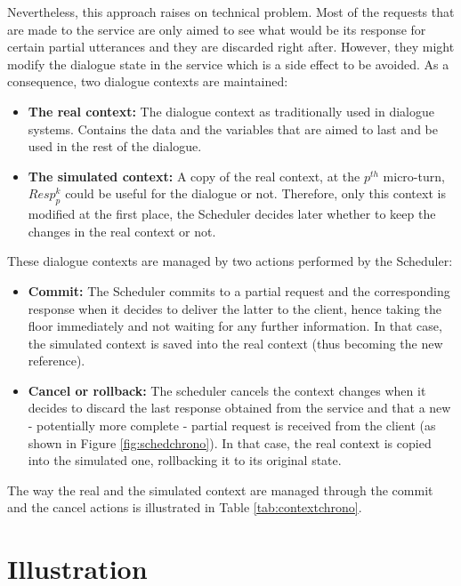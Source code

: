         Nevertheless, this approach raises on technical problem. Most of the requests that are made to the service are only aimed to see what would be its response for certain partial utterances and they are discarded right after. However, they might modify the dialogue state in the service which is a side effect to be avoided. As a consequence, two dialogue contexts are maintained:
        
        \begin{itemize}
           	\item \textbf{The real context:} The dialogue context as traditionally used in dialogue systems. Contains the data and the variables that are aimed to last and be used in the rest of the dialogue.
        	\item \textbf{The simulated context:} A copy of the real context, at the $p^{th}$ micro-turn, $Resp^k_p$ could be useful for the dialogue or not. Therefore, only this context is modified at the first place, the Scheduler decides later whether to keep the changes in the real context or not.
        \end{itemize}
        
        These dialogue contexts are managed by two actions performed by the Scheduler:
        
        \begin{itemize}
        	\item \textbf{Commit:} The Scheduler commits to a partial request and the corresponding response when it decides to deliver the latter to the client, hence taking the floor immediately and not waiting for any further information. In that case, the simulated context is saved into the real context (thus becoming the new reference).
            \item \textbf{Cancel or rollback:} The scheduler cancels the context changes when it decides to discard the last response obtained from the service and that a new - potentially more complete - partial request is received from the client (as shown in Figure \ref{fig:schedchrono}). In that case, the real context is copied into the simulated one, rollbacking it to its original state.
        \end{itemize}
 
 		The way the real and the simulated context are managed through the commit and the cancel actions is illustrated in Table \ref{tab:contextchrono}.

        
\section{Illustration}

